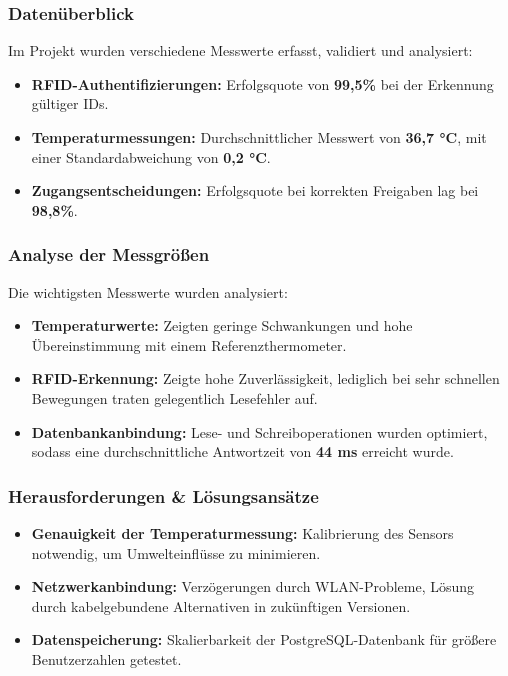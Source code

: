 \subsubsection{Datenüberblick}

Im Projekt wurden verschiedene Messwerte erfasst, validiert und analysiert:

\begin{itemize}
    \item \textbf{RFID-Authentifizierungen: }Erfolgsquote von \textbf{99,5\%} bei der Erkennung gültiger IDs.
    \item \textbf{Temperaturmessungen: }Durchschnittlicher Messwert von \textbf{36,7 °C}, mit einer Standardabweichung von \textbf{0,2 °C}.
    \item \textbf{Zugangsentscheidungen: }Erfolgsquote bei korrekten Freigaben lag bei \textbf{98,8\%}.
\end{itemize}

\subsubsection{Analyse der Messgrößen}

Die wichtigsten Messwerte wurden analysiert:

\begin{itemize}
    \item \textbf{Temperaturwerte: }Zeigten geringe Schwankungen und hohe Übereinstimmung mit einem Referenzthermometer.
    \item \textbf{RFID-Erkennung: }Zeigte hohe Zuverlässigkeit, lediglich bei sehr schnellen Bewegungen traten gelegentlich Lesefehler auf.
    \item \textbf{Datenbankanbindung: }Lese- und Schreiboperationen wurden optimiert, sodass eine durchschnittliche Antwortzeit von \textbf{44 ms} erreicht wurde.
\end{itemize}

\subsubsection{Herausforderungen \& Lösungsansätze}

\begin{itemize}
    \item \textbf{Genauigkeit der Temperaturmessung: }Kalibrierung des Sensors notwendig, um Umwelteinflüsse zu minimieren.
    \item \textbf{Netzwerkanbindung: }Verzögerungen durch WLAN-Probleme, Lösung durch kabelgebundene Alternativen in zukünftigen Versionen.
    \item \textbf{Datenspeicherung: }Skalierbarkeit der PostgreSQL-Datenbank für größere Benutzerzahlen getestet.
\end{itemize}

